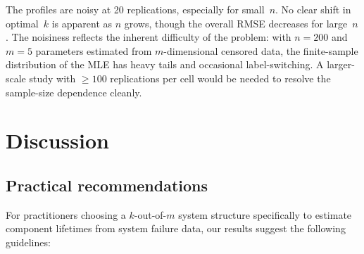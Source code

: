 \documentclass[12pt]{article}
\theoremstyle{definition}
\theoremstyle{remark}
\begin{document}
The profiles are noisy at 20 replications, especially for small~$n$.
No clear shift in optimal~$k$ is apparent as $n$ grows, though the
overall RMSE decreases for large~$n$.  The noisiness reflects the
inherent difficulty of the problem: with $n = 200$ and $m = 5$
parameters estimated from $m$-dimensional censored data, the
finite-sample distribution of the MLE has heavy tails and occasional
label-switching.  A larger-scale study with $\ge 100$ replications per
cell would be needed to resolve the sample-size dependence cleanly.


\section{Discussion}
\label{sec:discuss}

\subsection{Practical recommendations}
\label{sec:recommendations}

For practitioners choosing a $k$-out-of-$m$ system structure
specifically to estimate component lifetimes from system failure data,
our results suggest the following guidelines:
\end{document}
